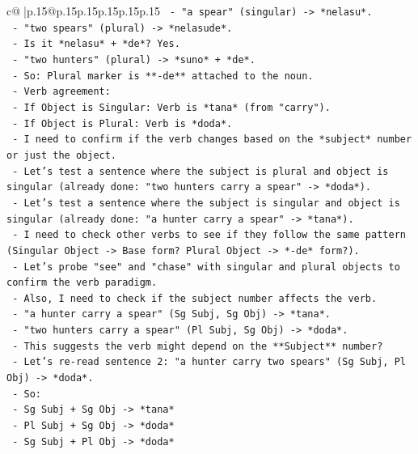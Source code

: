 \documentclass{article}
\begin{document}
{\begin{supertabular}{c@{$\;$}|p{.15\linewidth}@{}p{.15\linewidth}p{.15\linewidth}p{.15\linewidth}p{.15\linewidth}p{.15\linewidth}}
{{{\texttt{     {-} "a spear" (singular) {-}> *nelasu*.} \\
\texttt{     {-} "two spears" (plural) {-}> *nelasude*.} \\
\texttt{     {-} Is it *nelasu* + *de*? Yes.} \\
\texttt{     {-} "two hunters" (plural) {-}> *suno* + *de*.} \\
\texttt{   {-} So: Plural marker is **{-}de** attached to the noun.} \\
\texttt{   {-} Verb agreement:} \\
\texttt{     {-} If Object is Singular: Verb is *tana* (from "carry").} \\
\texttt{     {-} If Object is Plural: Verb is *doda*.} \\
\texttt{   {-} I need to confirm if the verb changes based on the *subject* number or just the object.} \\
\texttt{   {-} Let's test a sentence where the subject is plural and object is singular (already done: "two hunters carry a spear" {-}> *doda*).} \\
\texttt{   {-} Let's test a sentence where the subject is singular and object is singular (already done: "a hunter carry a spear" {-}> *tana*).} \\
\texttt{   {-} I need to check other verbs to see if they follow the same pattern (Singular Object {-}> Base form? Plural Object {-}> *{-}de* form?).} \\
\texttt{   {-} Let's probe "see" and "chase" with singular and plural objects to confirm the verb paradigm.} \\
\texttt{   {-} Also, I need to check if the subject number affects the verb.} \\
\texttt{     {-} "a hunter carry a spear" (Sg Subj, Sg Obj) {-}> *tana*.} \\
\texttt{     {-} "two hunters carry a spear" (Pl Subj, Sg Obj) {-}> *doda*.} \\
\texttt{     {-} This suggests the verb might depend on the **Subject** number?} \\
\texttt{     {-} Let's re{-}read sentence 2: "a hunter carry two spears" (Sg Subj, Pl Obj) {-}> *doda*.} \\
\texttt{     {-} So:} \\
\texttt{       {-} Sg Subj + Sg Obj {-}> *tana*} \\
\texttt{       {-} Pl Subj + Sg Obj {-}> *doda*} \\
\texttt{       {-} Sg Subj + Pl Obj {-}> *doda*} \\
}}}
\end{supertabular}}
\end{document}
